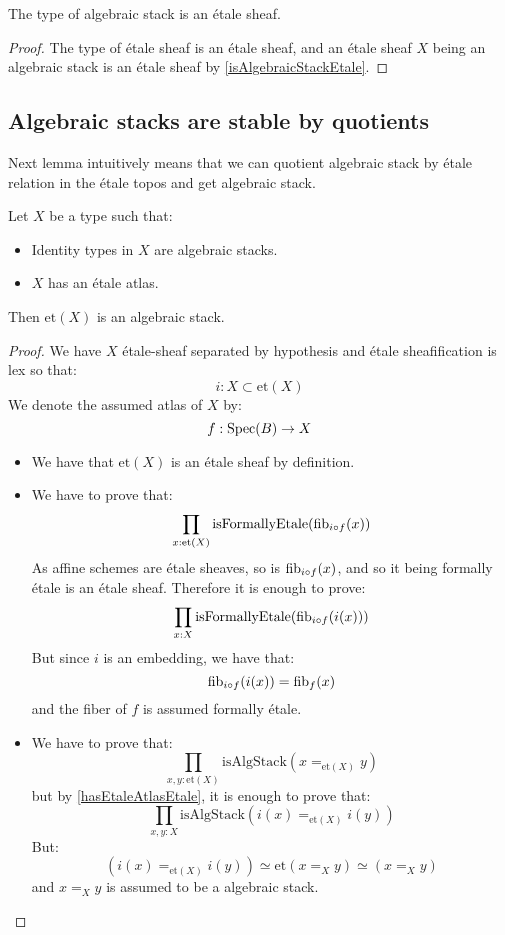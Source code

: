 \begin{corollary}
The type of algebraic stack is an étale sheaf.
\end{corollary}

\begin{proof}
The type of étale sheaf is an étale sheaf, and an étale sheaf $X$ being an algebraic stack is an étale sheaf by \cref{isAlgebraicStackEtale}.
\end{proof}

\subsection{Algebraic stacks are stable by quotients}

Next lemma intuitively means that we can quotient algebraic stack by étale relation in the étale topos and get algebraic stack.

\begin{lemma}
Let $X$ be a type such that:
\begin{itemize}
\item Identity types in $X$ are algebraic stacks.
\item $X$ has an étale atlas.
\end{itemize}
Then $\mathrm{et}(X)$ is an algebraic stack.
\end{lemma}

\begin{proof}
We have $X$ étale-sheaf separated by hypothesis and étale sheafification is lex so that:
\[i:X\subset \mathrm{et}(X)\]
We denote the assumed atlas of $X$ by: 
\[f: \operatorname{Spec}(B)\to X\]
\begin{itemize}
\item We have that $\mathrm{et}(X)$ is an étale sheaf by definition.
\item We have to prove that:
\[\prod_{x:\mathrm{et}(X)} \mathrm{isFormallyEtale}(\mathrm{fib}_{i\circ f}(x))\]
As affine schemes are étale sheaves, so is $\mathrm{fib}_{i\circ f}(x)$, and so it being formally étale is an étale sheaf. Therefore it is enough to prove:
\[\prod_{x:X} \mathrm{isFormallyEtale}(\mathrm{fib}_{i\circ f}(i(x)))\]
But since $i$ is an embedding, we have that:
\[\mathrm{fib}_{i\circ f}(i(x)) = \mathrm{fib}_f(x)\]
and the fiber of $f$ is assumed formally étale.
\item We have to prove that:
\[\prod_{x,y:\mathrm{et}(X)} \mathrm{isAlgStack}(x=_{\mathrm{et}(X)}y)\]
but by \cref{hasEtaleAtlasEtale}, it is enough to prove that:
\[\prod_{x,y:X} \mathrm{isAlgStack}(i(x)=_{\mathrm{et}(X)}i(y))\]
But:
\[(i(x)=_{\mathrm{et}(X)}i(y)) \simeq \mathrm{et}(x=_Xy) \simeq (x=_Xy)\]
and $x=_Xy$ is assumed to be a algebraic stack.
\end{itemize}
\end{proof}

